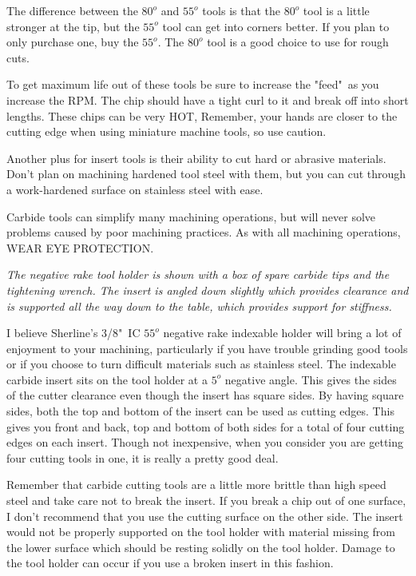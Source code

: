 The difference between the $80^{o}$ and $55^{o}$ tools is that the $80^{o}$ tool
is a little stronger at the tip, but the $55^{o}$ tool can get into corners
better. If you plan to only purchase one, buy the $55^{o}$. The $80^{o}$ tool is
a good choice to use for rough cuts.


To get maximum life out of these tools be sure to increase the "feed"\ as you
increase the RPM. The chip should have a tight curl to it and break off into
short lengths. These chips can be very HOT, Remember, your hands are closer to
the cutting edge when using miniature machine tools, so use caution.


Another plus for insert tools is their ability to cut hard or abrasive
materials. Don't plan on machining hardened tool steel with them, but you can
cut through a work-hardened surface on stainless steel with ease.

Carbide tools can simplify many machining operations, but will never solve
problems caused by poor machining practices. As with all machining operations,
WEAR EYE PROTECTION.

\bigskip
\textit{The negative rake tool holder is shown with a box of spare carbide tips
and the tightening wrench. The insert is angled down slightly which provides
clearance and is supported all the way down to the table, which provides support
for stiffness.}


I believe Sherline's 3/8"\ IC $55^{o}$ negative rake indexable holder will bring
a lot of enjoyment to your machining, particularly if you have trouble grinding
good tools or if you choose to turn difficult materials such as stainless steel.
The indexable carbide insert sits on the tool holder at a $5^{o}$ negative
angle. This gives the sides of the cutter clearance even though the insert has
square sides. By having square sides, both the top and bottom of the insert can
be used as cutting edges. This gives you front and back, top and bottom of both
sides for a total of four cutting edges on each insert. Though not inexpensive,
when you consider you are getting four cutting tools in one, it is really a
pretty good deal.

Remember that carbide cutting tools are a little more brittle than high speed
steel and take care not to break the insert. If you break a chip out of one
surface, I don't recommend that you use the cutting surface on the other side.
The insert would not be properly supported on the tool holder with material
missing from the lower surface which should be resting solidly on the tool
holder. Damage to the tool holder can occur if you use a broken insert in this
fashion.


